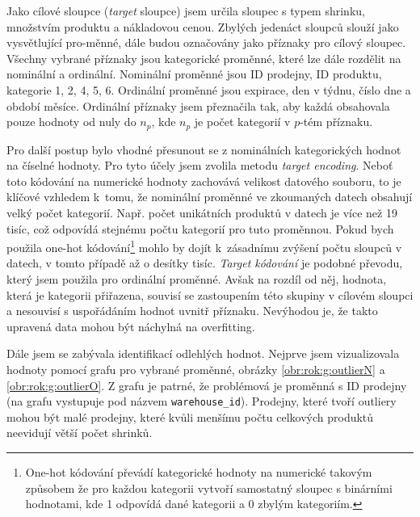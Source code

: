 Jako cílové sloupce (\emph{target} sloupce) jsem určila sloupec s typem shrinku, množstvím produktu a nákladovou cenou. Zbylých jedenáct sloupců slouží jako vysvětlující pro-\linebreak měnné, dále budou označovány jako příznaky pro cílový sloupec. Všechny vybrané příznaky jsou kategorické proměnné, které lze dále rozdělit na nominální a ordinální. Nominální proměnné jsou ID prodejny, ID produktu, kategorie 1, 2, 4, 5, 6. Ordinální proměnné jsou expirace, den v týdnu, číslo dne a období měsíce. Ordinální příznaky jsem přeznačila tak, aby každá obsahovala pouze hodnoty od nuly do $n_p$, kde $n_p$ je počet kategorií v $p$-tém příznaku. 

Pro další postup bylo vhodné přesunout se z nominálních kategorických hodnot na číselné hodnoty. Pro tyto účely jsem zvolila metodu \emph{target encoding}.  %
Neboť toto kódování na numerické hodnoty zachovává velikost datového souboru, to je klíčové vzhledem k~tomu, že nominální proměnné ve zkoumaných datech obsahují velký počet kategorií. 
Např. počet unikátních produktů v datech je více než 19 tisíc, což odpovídá stejnému počtu kategorií pro tuto proměnnou. Pokud bych použila one-hot kódování\footnote{One-hot kódování převádí kategorické hodnoty na numerické takovým způsobem že pro každou kategorii vytvoří samostatný sloupec s binárními hodnotami, kde 1 odpovídá dané kategorii a 0 zbylým kategoriím.}  mohlo by dojít k~zásadnímu zvýšení počtu sloupců v datech, v tomto případě až o desítky tisíc. \emph{Target kódování} je podobné převodu, který jsem použila pro ordinální proměnné. Avšak na rozdíl od něj, hodnota, která je kategorii přiřazena, souvisí se zastoupením této skupiny v cílovém sloupci a nesouvisí s uspořádáním hodnot uvnitř příznaku. Nevýhodou je, že takto upravená data mohou být náchylná na overfitting. 


Dále jsem se zabývala identifikací odlehlých hodnot. Nejprve jsem vizualizovala hodnoty pomocí grafu pro vybrané proměnné, obrázky \ref*{obr:rok:g:outlierN} a \ref*{obr:rok:g:outlierO}. Z grafu je patrné, že problémová je proměnná s ID prodejny (na grafu vystupuje pod názvem \texttt{warehouse\_id}). Prodejny, které tvoří outliery mohou být malé prodejny, které kvůli menšímu počtu celkových produktů neevidují větší počet shrinků. %

